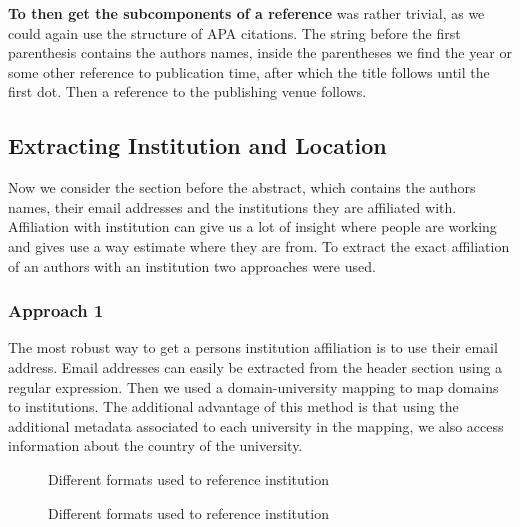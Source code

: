 \documentclass[article,twocolumn]{IEEEtran}
\begin{document}
\textbf{To then get the subcomponents of a reference} was rather
trivial, as we could again use the structure of APA citations. The
string before the first parenthesis contains the authors names, inside
the parentheses we find the year or some other reference to publication
time, after which the title follows until the first dot. Then a
reference to the publishing venue follows.

    \hypertarget{extracting-institution-and-location}{%
\subsection{Extracting Institution and
Location}\label{extracting-institution-and-location}}

Now we consider the section before the abstract, which contains the
authors names, their email addresses and the institutions they are
affiliated with. Affiliation with institution can give us a lot of
insight where people are working and gives use a way estimate where they
are from. To extract the exact affiliation of an authors with an
institution two approaches were used.

\hypertarget{approach-1}{%
\subsubsection{Approach 1}\label{approach-1}}

The most robust way to get a persons institution affiliation is to use
their email address. Email addresses can easily be extracted from the
header section using a regular expression. Then we used a
domain-university mapping \cite{mapping} to map domains to institutions.
The additional advantage of this method is that using the additional
metadata associated to each university in the mapping, we also access
information about the country of the university.


    \begin{figure}
        \begin{center}\end{center}
        \caption{Different formats used to reference institution}
        \label{figA}
    \end{figure}
    

    \begin{figure}
        \begin{center}\end{center}
        \caption{Different formats used to reference institution}
        \label{figB}
    \end{figure}
    
\end{document}
